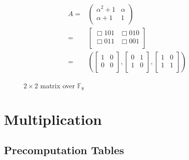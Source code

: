 \documentclass[11pt]{beamer}
\newcommand{\field}[1]{\mathbb{#1}}
\newcommand{\F}{\ensuremath{\field{F}}\xspace}
\begin{document}
\begin{frame}[allowframebreaks]
\begin{figure}[ht]
\begin{eqnarray*}
A =& \left(\begin{array}{cc}
          \alpha^2 + 1 & \alpha \\
          \alpha + 1 & 1 \\
       \end{array}\right)\\
 = & \left[\begin{array}{cc}\Box101&\Box010\\
                                  \Box011&\Box001\\
     \end{array}\right]\\
 = & \left(\left[\begin{array}{cc}
1&0\\
0&0\\
\end{array}\right], \left[\begin{array}{cc}
0&1\\
1&0\\
\end{array}\right], \left[\begin{array}{cccc}
1&0\\
1&1\\
\end{array}\right]\right)
\end{eqnarray*}
\caption{$2 \times 2$ matrix over $\F_{8}$}
\label{fig:example}
\end{figure}


\end{frame}


\section{Multiplication}
\subsection{Precomputation Tables}
\end{document}
